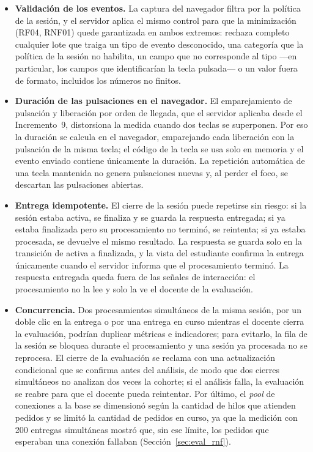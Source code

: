 \begin{itemize}
    \item \textbf{Validación de los eventos.} La captura del navegador filtra por la política de la sesión, y el servidor aplica el mismo control para que la minimización (RF04, RNF01) quede garantizada en ambos extremos: rechaza completo cualquier lote que traiga un tipo de evento desconocido, una categoría que la política de la sesión no habilita, un campo que no corresponde al tipo ---en particular, los campos que identificarían la tecla pulsada--- o un valor fuera de formato, incluidos los números no finitos.
    \item \textbf{Duración de las pulsaciones en el navegador.} El emparejamiento de pulsación y liberación por orden de llegada, que el servidor aplicaba desde el Incremento~9, distorsiona la medida cuando dos teclas se superponen. Por eso la duración se calcula en el navegador, emparejando cada liberación con la pulsación de la misma tecla; el código de la tecla se usa solo en memoria y el evento enviado contiene únicamente la duración. La repetición automática de una tecla mantenida no genera pulsaciones nuevas y, al perder el foco, se descartan las pulsaciones abiertas.
    \item \textbf{Entrega idempotente.} El cierre de la sesión puede repetirse sin riesgo: si la sesión estaba activa, se finaliza y se guarda la respuesta entregada; si ya estaba finalizada pero su procesamiento no terminó, se reintenta; si ya estaba procesada, se devuelve el mismo resultado. La respuesta se guarda solo en la transición de activa a finalizada, y la vista del estudiante confirma la entrega únicamente cuando el servidor informa que el procesamiento terminó. La respuesta entregada queda fuera de las señales de interacción: el procesamiento no la lee y solo la ve el docente de la evaluación.
    \item \textbf{Concurrencia.} Dos procesamientos simultáneos de la misma sesión, por un doble clic en la entrega o por una entrega en curso mientras el docente cierra la evaluación, podrían duplicar métricas e indicadores; para evitarlo, la fila de la sesión se bloquea durante el procesamiento y una sesión ya procesada no se reprocesa. El cierre de la evaluación se reclama con una actualización condicional que se confirma antes del análisis, de modo que dos cierres simultáneos no analizan dos veces la cohorte; si el análisis falla, la evaluación se reabre para que el docente pueda reintentar. Por último, el \textit{pool} de conexiones a la base se dimensionó según la cantidad de hilos que atienden pedidos y se limitó la cantidad de pedidos en curso, ya que la medición con 200 entregas simultáneas mostró que, sin ese límite, los pedidos que esperaban una conexión fallaban (Sección~\ref{sec:eval_rnf}).
\end{itemize}

